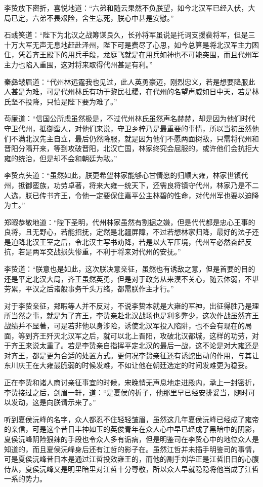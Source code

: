 李贽放下密折，喜悦地道：“六弟和随云果然不负朕望，如今北汉军已经入伏，大局已定，六弟不畏艰险，舍生忘死，朕心中甚是安慰。”

石彧笑道：“陛下为北汉之战筹谋良久，长孙将军虽说是托词支援裴将军，但是三十万大军无声无息地赶赴泽州，陛下可是费尽了心思，如今总算是将北汉军主力困住，凭着齐王殿下的用兵手段，龙庭飞就是在用兵如神也不可能突围，而且代州军主力也陷入重围，这对将来取得代州甚是有利。”

秦彝皱眉道：“代州林远霆我也见过，此人英勇豪迈，刚烈忠义，若是想要降服此人甚是为难，可是代州林氏有功于黎民社稷，在代州的名望声威如日中天，若是林氏坚不投降，只怕是陛下要为难了。”

苟廉道：“信国公所虑虽然极是，不过代州林氏虽然声名赫赫，却是因为他们时代守卫代州，抵御蛮人，对他们来说，守卫乡梓乃是最重要的事情，所以当初虽然他们不满北汉先主自立，最后仍然降服，就是因为他们不愿两面树敌，只需将代州和晋阳分隔开来，等到攻破晋阳，北汉亡国，林家终究会屈服的，或许他们会抗拒大雍的统治，但是却不会和朝廷为敌。”

李贽点头道：“虽然如此，朕更希望林家能够心甘情愿的归顺大雍，林家世镇代州，抵御蛮族，功劳卓著，将来大雍一统天下，还需良将镇守代州，林家乃是不二人选，朕已传书齐王，令他一定要保住嘉平公主林碧的性命，对代州军也要以迫降为主。”

郑暇恭敬地道：“陛下圣明，代州林家虽然有割据之嫌，但是代代都是忠心王事的良将，且无野心，若能招抚，定然是北疆屏障，不过若想林家归降，最好的法子还是迫降北汉王室之后，令北汉主写书劝降，若是以大军压境，代州军必然奋起反抗，若是两军交战损失惨重，不利于将来对代州的安抚。”

李贽道：“朕意也是如此，这次朕决意亲征，虽然也有诱敌之意，但是首要的目的还是平定北汉大局，齐王虽然英勇，但是对于政务从来漠不关心，随云体弱，不堪劳累，平汉之后诸般事务千头万绪，都需朕作主才行。”

对于李贽亲征，郑暇等人并不反对，不说李贽本就是大雍的军神，出征得胜乃是理所当然之事，就是为了齐王，李贽亲赴北汉战场也是利多弊少，这次作战虽然齐王战绩并不显著，可是若非他以身涉险，诱使北汉军投入陷阱，也不会有现在的局面，等到齐王歼灭北汉军之后，就可以北上晋阳，攻破北汉都城，这样的功劳，对于齐王来说太重了。若是李贽亲自指挥平定北汉的最后一战，这不论是对大雍还是对齐王，都是更为合适的处置方式。更何况李贽亲征还有诱蛇出动的作用，与其让东川庆王在大雍最脆弱的时候发难，不如让他在朝廷选定的时间发难更为稳妥。

正在李贽和诸人商讨亲征事宜的时候，宋晚悄无声息地走进殿内，承上一封密折，李贽接过之后，剑眉一轩，道：“是夏侯的折子，他那里早已经安排妥当，随时可以发动，这是向朕请示来了。”

听到夏侯沅峰的名字，众人都忍不住轻轻皱眉，虽然这几年夏侯沅峰已经成了雍帝的亲信，可是这个昔日丰神如玉的英俊青年在众人心中早已经成了黑暗中的阴影，夏侯沅峰阴险狠辣的手段也令众人多有诟病，但是明鉴司在李贽心中的地位众人是知道的，而且夏侯沅峰身后还有江哲的影子在。虽然江哲并未插手明鉴司的事情，可是夏侯沅峰昔日本是通过江哲投效雍王的，而他的副手刘华正是江哲旧日的心腹侍从，夏侯沅峰又是明里暗里对江哲十分尊敬，所以众人早就隐隐将他当成了江哲一系的势力。

